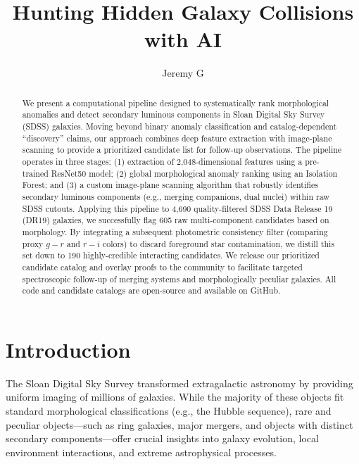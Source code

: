 \documentclass[twocolumn]{aastex631}
\begin{document}
\title{\Large Hunting Hidden Galaxy Collisions with AI}

\author{Jeremy G}

\begin{abstract}
We present a computational pipeline designed to systematically rank morphological anomalies and detect secondary luminous components in Sloan Digital Sky Survey (SDSS) galaxies. Moving beyond binary anomaly classification and catalog-dependent ``discovery'' claims, our approach combines deep feature extraction with image-plane scanning to provide a prioritized candidate list for follow-up observations. The pipeline operates in three stages: (1) extraction of 2,048-dimensional features using a pre-trained ResNet50 model; (2) global morphological anomaly ranking using an Isolation Forest; and (3) a custom image-plane scanning algorithm that robustly identifies secondary luminous components (e.g., merging companions, dual nuclei) within raw SDSS cutouts. Applying this pipeline to 4,690 quality-filtered SDSS Data Release 19 (DR19) galaxies, we successfully flag 605 raw multi-component candidates based on morphology. By integrating a subsequent photometric consistency filter (comparing proxy $g-r$ and $r-i$ colors) to discard foreground star contamination, we distill this set down to 190 highly-credible interacting candidates. We release our prioritized candidate catalog and overlay proofs to the community to facilitate targeted spectroscopic follow-up of merging systems and morphologically peculiar galaxies. All code and candidate catalogs are open-source and available on GitHub.
\end{abstract}


\section{Introduction} \label{sec:intro}

The Sloan Digital Sky Survey \citep[SDSS;][]{york2000} transformed extragalactic astronomy by providing uniform imaging of millions of galaxies. While the majority of these objects fit standard morphological classifications (e.g., the Hubble sequence), rare and peculiar objects---such as ring galaxies, major mergers, and objects with distinct secondary components---offer crucial insights into galaxy evolution, local environment interactions, and extreme astrophysical processes. 
\end{document}
